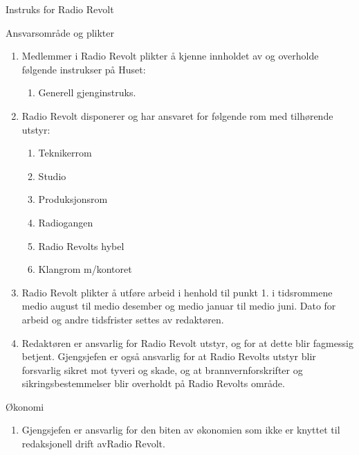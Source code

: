\begin{instruks*}{Instruks for Radio Revolt}
    
    \begin{instruksledd}{Ansvarsområde og plikter}
        \begin{enumerate}   
            \item  Medlemmer i Radio Revolt plikter å kjenne innholdet av og overholde følgende
                instrukser på Huset:
                \begin{enumerate}
                    \item Generell gjenginstruks.
                \end{enumerate}
            \item Radio Revolt disponerer og har ansvaret for følgende rom med tilhørende utstyr:
                \begin{enumerate}
                    \item Teknikerrom
                    \item Studio
                    \item Produksjonsrom
                    \item Radiogangen
                    \item Radio Revolts hybel
                    \item Klangrom m/kontoret
                \end{enumerate}
            \item Radio Revolt plikter å utføre arbeid i henhold til punkt 1. i tidsrommene
                medio august til medio desember og medio januar til medio juni. Dato for arbeid og andre tidsfrister
                settes av redaktøren.
            \item Redaktøren er ansvarlig for Radio Revolt utstyr, og for at dette blir fagmessig
                betjent. Gjengsjefen er også ansvarlig for at Radio Revolts utstyr blir forsvarlig sikret mot tyveri
                og skade, og at brannvernforskrifter og sikringsbestemmelser blir overholdt på Radio Revolts område.
        \end{enumerate}
    \end{instruksledd}


    \begin{instruksledd}{Økonomi}
        \begin{enumerate}
            \item Gjengsjefen er ansvarlig for den biten av økonomien som ikke er knyttet til
                redaksjonell drift avRadio Revolt.
        \end{enumerate}
    \end{instruksledd}
    

\end{instruks*}
